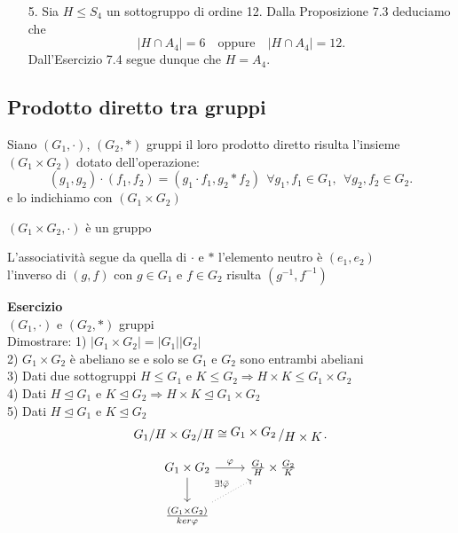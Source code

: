\documentclass[12px]{article}
\begin{document}
{\begin{enumerate}
    \item[5.] Sia $H \leq S_4$ un sottogruppo di ordine 12. Dalla Proposizione 7.3 deduciamo che 
    \[
    \lvert H \cap A_4 \rvert = 6 \quad \text{oppure} \quad \lvert H \cap A_4 \rvert = 12.
    \]
    Dall’Esercizio 7.4 segue dunque che $H = A_4$.
\end{enumerate}


		 \newpage
	\subsection{Prodotto diretto tra gruppi}
	\begin{defi}
		Siano $(G_1,\cdot)$, $(G_2, *)$ gruppi il loro prodotto diretto risulta l'insieme $(G_1\times G_2)$ dotato dell'operazione:
		\[
			(g_1,g_2)\cdot(f_1,f_2) = (g_1\cdot f_1, g_2 * f_2) \ \ \forall g_1,f_1\in G_1, \ \ \forall g_2,f_2\in G_2
		.\]
		e lo indichiamo con $(G_1\times G_2)$
	\end{defi}
	\begin{prop}
		$(G_1\times G_2, \cdot)$ è un gruppo
	\end{prop}
	\begin{dimo}
		L'associatività segue da quella di $\cdot$ e  $*$ l'elemento neutro è  $(e_1,e_2)$\\
		l'inverso di $(g,f)$ con  $g\in G_1$ e $f\in G_2$ risulta $(g^{-1},f^{-1})$
	\end{dimo}
	\textbf{Esercizio}\\
	$(G_1, \cdot)$ e  $(G_2,*)$ gruppi\\
	Dimostrare:
	1) $|G_1\times G_2| = |G_1||G_2|$\\
	2) $G_1\times G_2$ è abeliano se e solo se $G_1$ e $G_2$ sono entrambi abeliani\\
	3) Dati due sottogruppi $H\leq G_1$ e $K\leq G_2 \Rightarrow H\times K\leq G_1\times G_2$ \\
	4) Dati $H\trianglelefteq G_1$ e $K\trianglelefteq G_2 \Rightarrow H\times K \trianglelefteq G_1\times G_2$ \\
	5) Dati  $H\trianglelefteq G_1$ e $K\trianglelefteq G_2$\\
	\[
		G_1/H \times G_2/H \cong \bigslant{G_1\times G_2}{H\times K}
	.\] 
	\begin{dimo}[4,5]
	\[
\begin{tikzcd}
G_1 \times G_2 \arrow[r, " \varphi"] \arrow[d] & \frac{G_1}{H} \times \frac{G_2}{K} \\
\frac{(G_1 \times G_2)}{ker \varphi} \arrow[ur, dotted, "\exists ! \bar \varphi"]
\end{tikzcd}
\]


\end{dimo}}
\end{document}
